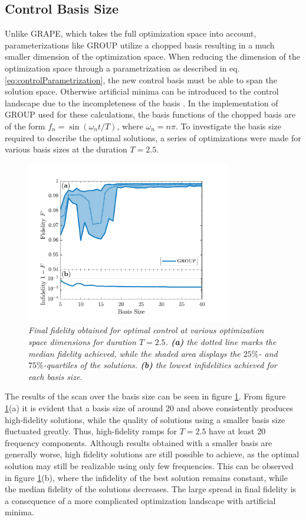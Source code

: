 \subsection{Control Basis Size}
Unlike GRAPE, which takes the full optimization space into account, parameterizations like GROUP utilize a chopped basis resulting in a much smaller dimension of the optimization space. When reducing the dimension of the optimization space through a parametrization as described in eq. \eqref{eq:controlParametrization}, the new control basis must be able to span the solution space. Otherwise artificial minima can be introduced to the control landscape due to the incompleteness of the basis \cite{Rach2015}. 
In the implementation of GROUP used for these calculations, the basis functions of the chopped basis are of the form $f_n = \sin \left( \omega_n t / T \right)$, where $\omega_n = n \pi$.
To investigate the basis size required to describe the optimal solutions, a series of optimizations were made for various basis sizes at the duration $T = 2.5$. 
\begin{figure}[h!]
    \centering
    \includegraphics[width=0.8\textwidth]{Figures/5part/BestFidelityBasisSize.pdf}
    \caption{\textit{Final fidelity obtained for optimal control at various optimization space dimensions for duration $T = 2.5$. \textbf{(a)} the dotted line marks the median fidelity achieved, while the shaded area displays the $25\%$- and $75\%$-quartiles of the solutions. \textbf{(b)} the lowest infidelities achieved for each basis size.}}
    \label{fig:FidelityBasisSize5}
\end{figure}
The results of the scan over the basis size can be seen in figure \ref{fig:FidelityBasisSize5}. From figure \ref{fig:FidelityBasisSize5}(a) it is evident that a basis size of around 20 and above consistently produces high-fidelity solutions, while the quality of solutions using a smaller basis size fluctuated greatly. Thus, high-fidelity ramps for $T = 2.5$ have at least 20 frequency components. Although results obtained with a smaller basis are generally worse, high fidelity solutions are still possible to achieve, as the optimal solution may still be realizable using only few frequencies. This can be observed in figure \ref{fig:FidelityBasisSize5}(b), where the infidelity of the best solution remains constant, while the median fidelity of the solutions decreases. The large spread in final fidelity is a consequence of a more complicated optimization landscape with artificial minima.


